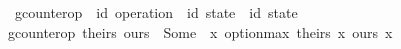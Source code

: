 \begin{isabellebody}%
\isamarkupfalse%
\ gcounter{\isacharunderscore}op\ {\isacharcolon}{\isacharcolon}\ {\isachardoublequoteopen}{\isacharparenleft}{\isacharprime}id\ operation{\isacharparenright}\ {\isasymRightarrow}\ {\isacharparenleft}{\isacharprime}id\ state{\isacharparenright}\ {\isasymrightharpoonup}\ {\isacharparenleft}{\isacharprime}id\ state{\isacharparenright}{\isachardoublequoteclose}\ \isanewline
{\isachardoublequoteopen}gcounter{\isacharunderscore}op\ theirs\ ours\ {\isacharequal}\ Some\ {\isacharparenleft}{\isasymlambda}\ x{\isachardot}\ option{\isacharunderscore}max\ {\isacharparenleft}theirs\ x{\isacharparenright}\ {\isacharparenleft}ours\ x{\isacharparenright}{\isacharparenright}{\isachardoublequoteclose}
\end{isabellebody}
\endinput
